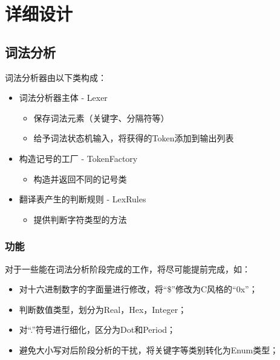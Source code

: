 \documentclass[../main.tex]{subfiles}
\begin{document}
\section{详细设计}





\subsection{词法分析}

词法分析器由以下类构成：
\begin{itemize}
\item 词法分析器主体 - Lexer
    \begin{itemize}
        \item 保存词法元素（关键字、分隔符等）
        \item 给予词法状态机输入，将获得的Token添加到输出列表
    \end{itemize}
\item 构造记号的工厂 - TokenFactory
    \begin{itemize}
        \item 构造并返回不同的记号类
    \end{itemize}
\item 翻译表产生的判断规则 - LexRules
    \begin{itemize}
        \item 提供判断字符类型的方法
    \end{itemize}
\end{itemize}

\subsubsection{功能}

对于一些能在词法分析阶段完成的工作，将尽可能提前完成，如：
\begin{itemize}
\item 对十六进制数字的字面量进行修改，将“\$”修改为C风格的“0x”；
\item 判断数值类型，划分为Real，Hex，Integer；
\item 对“.”符号进行细化，区分为Dot和Period；
\item 避免大小写对后阶段分析的干扰，将关键字等类别转化为Enum类型；
\end{itemize}
\end{document}
